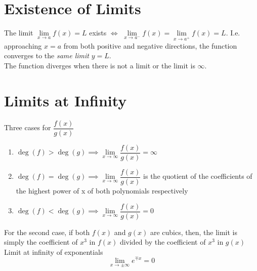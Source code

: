 \documentclass[11pt]{article}
\newcommand{\lb}{\\[8pt]}
\begin{document}
\section{Existence of Limits}
The limit $\lim\limits_{x\to a}{f(x)} = L$ exists $\iff$ $\lim\limits_{x\to a^-}{f(x)} = \lim\limits_{x\to a^+}{f(x)} = L$. I.e. approaching $x = a$ from both positive and negative directions, the function converges to the \textit{same limit} $y = L$.\lb
The function diverges when there is not a limit or the limit is $\infty$.

\pagebreak

\section{Limits at Infinity}

Three cases for $\dfrac{f(x)}{g(x)}$
\begin{enumerate}
  \item $\deg(f) >\deg(g) \implies \lim\limits_{x\to\infty}{\dfrac{f(x)}{g(x)}}= \infty$
  \item $\deg(f) =\deg(g) \implies \lim\limits_{x\to\infty}{\dfrac{f(x)}{g(x)}}$ is the quotient of the coefficients of the highest power of x of both polynomials respectively
  \item $\deg(f) <\deg(g) \implies \lim\limits_{x\to\infty}{\dfrac{f(x)}{g(x)}}= 0$
\end{enumerate}
For the second case, if both $f(x)$ and $g(x)$ are cubics, then, the limit is simply the coefficient of $x^3$ in $f(x)$ divided by the coefficient of $x^3$ in $g(x)$\lb
Limit at infinity of exponentials
$$\lim\limits_{x\to\pm\infty} e^{\mp x} = 0$$
\end{document}
